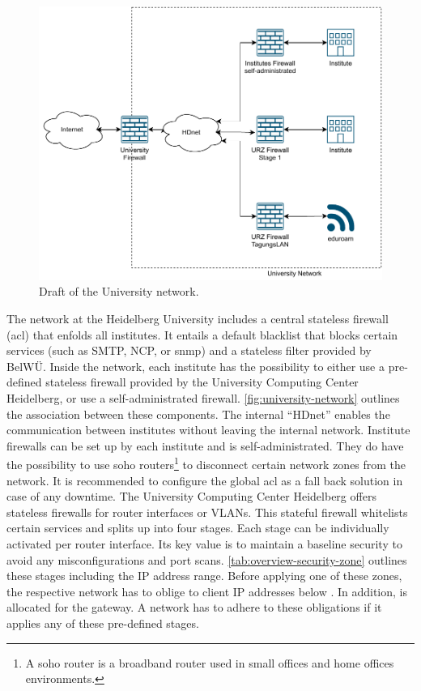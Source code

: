 \begin{figure}[ht]
    \centering
    \includegraphics[width=\textwidth]{figures/university-network.pdf}
    \caption[Draft of the University network]{
        Draft of the University network.
    }
    \label{fig:university-network}
\end{figure}

The network at the Heidelberg University includes a central stateless firewall (\ac{acl}) that enfolds all institutes.
It entails a default blacklist that blocks certain services (such as SMTP, NCP, or \ac{snmp}) and a stateless filter provided by BelWÜ.
Inside the network, each institute has the possibility to either use a pre-defined stateless firewall provided by the University Computing Center Heidelberg, or use a self-administrated firewall.
\autoref{fig:university-network} outlines the association between these components.
The internal \enquote{HDnet} enables the communication between institutes without leaving the internal network.
Institute firewalls can be set up by each institute and is self-administrated.
They do have the possibility to use \acs{soho} routers\footnote{A \acl{soho} router is a broadband router used in small offices and home offices environments.} to disconnect certain network zones from the network.
It is recommended to configure the global \ac{acl} as a fall back solution in case of any downtime.
The University Computing Center Heidelberg offers stateless firewalls for router interfaces or VLANs.
This stateful firewall whitelists certain services and splits up into four stages.
Each stage can be individually activated per router interface.
Its key value is to maintain a baseline security to avoid any misconfigurations and port scans.
\autoref{tab:overview-security-zone} outlines these stages including the IP address range.
Before applying one of these zones, the respective network has to oblige to client IP addresses below .
In addition,  is allocated for the gateway.
A network has to adhere to these obligations if it applies any of these pre-defined stages.


